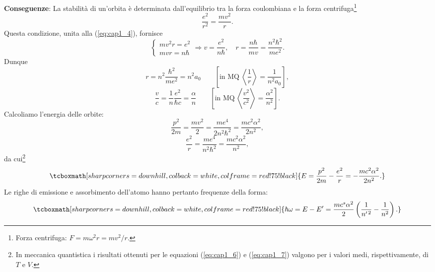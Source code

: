 \documentclass[a4paper,12pt,oneside]{book}
\begin{document}
\textbf{Conseguenze}:
La stabilità di un'orbita è determinata dall'equilibrio tra la forza coulombiana e la forza centrifuga\footnote{Forza centrifuga: $F= m\omega ^2 r = mv^2 /r$.}
	\begin{equation}
	\frac{e^2}{r^2}=\frac{mv^2}{r} .
	\end{equation}	
Questa condizione, unita alla (\ref{eq:cap1_4}), fornisce
	\begin{equation}
		\begin{cases}
		mv^2 r= e^2 \\
		mvr =n\hbar		
		\end{cases}
		\Rightarrow v=\frac{e^2}{n\hbar}, \quad r=\frac{n\hbar}{mv}=\frac{n^2 \hbar ^2}{me^2} .
	\end{equation}
Dunque
	\begin{equation}
	r=n^2 \frac{\hbar ^2}{me^2}= n^2 a_0 \qquad \left[\textrm{in MQ}\ \left\langle\frac{1}{r}\right\rangle = \frac{1}{n^2 a_0}\right],
	\end{equation}
		\begin{equation}
	\frac{v}{c}= \frac{1}{n}\frac{e^2}{\hbar c}=\frac{\alpha}{n} \qquad \left[\textrm{in MQ}\ \left\langle\frac{v^2}{c^2}\right\rangle = \frac{\alpha ^2}{n^2}\right].
	\end{equation}
Calcoliamo l'energia delle orbite:
	\begin{equation}
		\frac{p^2}{2m}= \frac{mv^2}{2} =\frac{me^4}{2n^2 \hbar ^2} =\frac{mc^2 \alpha ^2}{2n^2},
		\label{eq:cap1_6}
	\end{equation}
	\begin{equation}
		\frac{e^2}{r}= \frac{me^4}{n^2 \hbar^2} =\frac{mc^2 \alpha ^2}{n^2},
		\label{eq:cap1_7}
	\end{equation}
da cui\footnote{In meccanica quantistica i risultati ottenuti per le equazioni (\ref{eq:cap1_6}) e (\ref{eq:cap1_7}) valgono per i valori medi, rispettivamente, di $T$ e $V$.}
	\begin{equation}
		\tcboxmath[sharp corners=downhill ,colback=white,colframe=red!75!black]{
			E=\frac{p^2}{2m}-\frac{e^2}{r}=-\frac{mc^2\alpha ^2}{2n^2}. }
	\end{equation}
Le righe di emissione e assorbimento dell'atomo hanno pertanto frequenze della forma:
	\begin{equation}
		\tcboxmath[sharp corners=downhill ,colback=white,colframe=red!75!black]{
			\hbar \omega = E-E' =\frac{mc^s \alpha ^2}{2}\left(\frac{1}{n^{\prime \, 2}} - \frac{1}{n^2}\right).
			}
	\end{equation}
\end{document}
